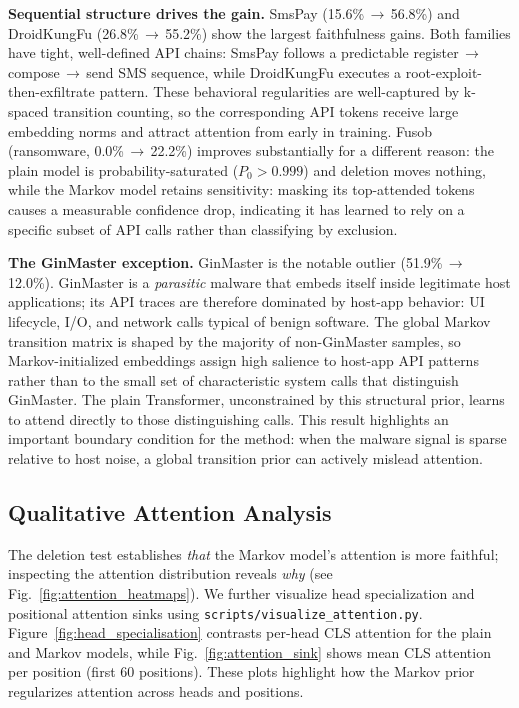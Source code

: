 \documentclass[12pt]{report}
\begin{document}
\textbf{Sequential structure drives the gain.}
SmsPay (15.6\%\,$\to$\,56.8\%) and DroidKungFu (26.8\%\,$\to$\,55.2\%)
show the largest faithfulness gains. Both families have tight,
well-defined API chains: SmsPay follows a predictable
register\,$\to$\,compose\,$\to$\,send SMS sequence, while DroidKungFu
executes a root-exploit-then-exfiltrate pattern.
These behavioral regularities are well-captured by k-spaced transition
counting, so the corresponding API tokens receive large embedding
norms and attract attention from early in training.
Fusob (ransomware, 0.0\%\,$\to$\,22.2\%) improves substantially for a
different reason: the plain model is probability-saturated
($P_0{>}0.999$) and deletion moves nothing, while the Markov model
retains sensitivity: masking its top-attended tokens causes a
measurable confidence drop, indicating it has learned to rely on
a specific subset of API calls rather than classifying by exclusion.

\textbf{The GinMaster exception.}
GinMaster is the notable outlier (51.9\%\,$\to$\,12.0\%).
GinMaster is a \textit{parasitic} malware that embeds itself inside
legitimate host applications; its API traces are therefore dominated
by host-app behavior: UI lifecycle, I/O, and network calls typical
of benign software. The global Markov transition matrix is shaped by
the majority of non-GinMaster samples, so Markov-initialized embeddings
assign high salience to host-app API patterns rather than to the
small set of characteristic system calls that distinguish GinMaster.
The plain Transformer, unconstrained by this structural prior, learns
to attend directly to those distinguishing calls.
This result highlights an important boundary condition for the method:
when the malware signal is sparse relative to host noise, a global
transition prior can actively mislead attention.

\subsection{Qualitative Attention Analysis}

The deletion test establishes \textit{that} the Markov model's
attention is more faithful; inspecting the attention distribution
reveals \textit{why} (see Fig.~\ref{fig:attention_heatmaps}). We further
visualize head specialization and positional attention sinks using
\texttt{scripts/visualize\_attention.py}. Figure~\ref{fig:head_specialisation}
contrasts per-head CLS attention for the plain and Markov models, while
Fig.~\ref{fig:attention_sink} shows mean CLS attention per position (first
60 positions). These plots highlight how the Markov prior regularizes
attention across heads and positions.
\end{document}
